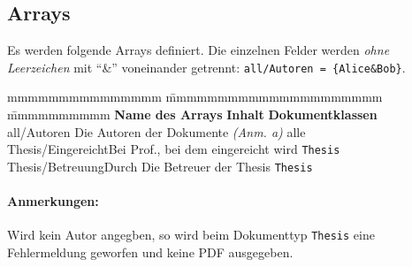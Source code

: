 		\subsection{Arrays}
			Es werden folgende Arrays definiert. Die einzelnen Felder werden \emph{ohne Leerzeichen} mit "`\&"' voneinander getrennt: \verb|all/Autoren = {Alice&Bob}|.
			\begin{tabbing}
				mmmmmmmmmmmmmmm				\= mmmmmmmmmmmmmmmmmmmmm						\=	mmmmmmmmmm					\kill
				\textbf{Name des Arrays}	\> \textbf{Inhalt}								\> \textbf{Dokumentklassen}		\\
				 all/Autoren				\> Die Autoren der Dokumente \emph{(Anm. a)}	\> alle							\\
				 Thesis/EingereichtBei		\> Prof., bei dem eingereicht wird				\> \texttt{Thesis} 				\\
				 Thesis/BetreuungDurch		\> Die Betreuer der Thesis						\> \texttt{Thesis}
			\end{tabbing}

			\paragraph*{Anmerkungen:}
				\begin{enumeratealpha}
					\item Wird kein Autor angegben, so wird beim Dokumenttyp \texttt{Thesis} eine Fehlermeldung geworfen und keine PDF ausgegeben.
				\end{enumeratealpha}

